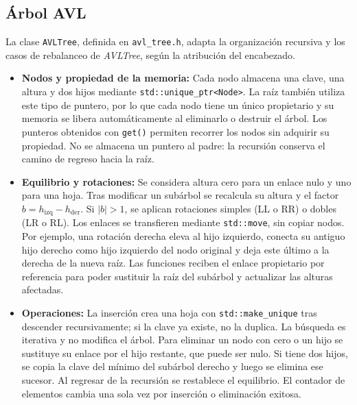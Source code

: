 \documentclass[11pt,letterpaper]{article}
\begin{document}
\subsection{Árbol AVL}

La clase \texttt{AVLTree}, definida en \texttt{avl\_tree.h}, adapta la
organización recursiva y los casos de rebalanceo de \textit{AVLTree},
según la atribución del encabezado.

\begin{itemize}
    \item \textbf{Nodos y propiedad de la memoria:}
    Cada nodo almacena una clave, una altura y dos hijos mediante
    \texttt{std::unique\_ptr<Node>}. La raíz también utiliza este tipo
    de puntero, por lo que cada nodo tiene un único propietario y su
    memoria se libera automáticamente al eliminarlo o destruir el árbol.
    Los punteros obtenidos con \texttt{get()} permiten recorrer los nodos
    sin adquirir su propiedad. No se almacena un puntero al padre: la
    recursión conserva el camino de regreso hacia la raíz.

    \item \textbf{Equilibrio y rotaciones:}
    Se considera altura cero para un enlace nulo y uno para una hoja.
    Tras modificar un subárbol se recalcula su altura y el factor
    $b=h_{\mathrm{izq}}-h_{\mathrm{der}}$. Si $|b|>1$, se aplican
    rotaciones simples (LL o RR) o dobles (LR o RL).
    Los enlaces se transfieren mediante \texttt{std::move}, sin copiar
    nodos. Por ejemplo, una rotación derecha eleva al hijo izquierdo,
    conecta su antiguo hijo derecho como hijo izquierdo del nodo original
    y deja este último a la derecha de la nueva raíz. Las funciones
    reciben el enlace propietario por referencia para poder sustituir
    la raíz del subárbol y actualizar las alturas afectadas.

    \item \textbf{Operaciones:}
    La inserción crea una hoja con \texttt{std::make\_unique} tras
    descender recursivamente; si la clave ya existe, no la duplica.
    La búsqueda es iterativa y no modifica el árbol. Para eliminar un
    nodo con cero o un hijo se sustituye su enlace por el hijo restante,
    que puede ser nulo. Si tiene dos hijos, se copia la clave del mínimo
    del subárbol derecho y luego se elimina ese sucesor. Al regresar de
    la recursión se restablece el equilibrio. El contador de elementos
    cambia una sola vez por inserción o eliminación exitosa.
\end{itemize}
\end{document}
